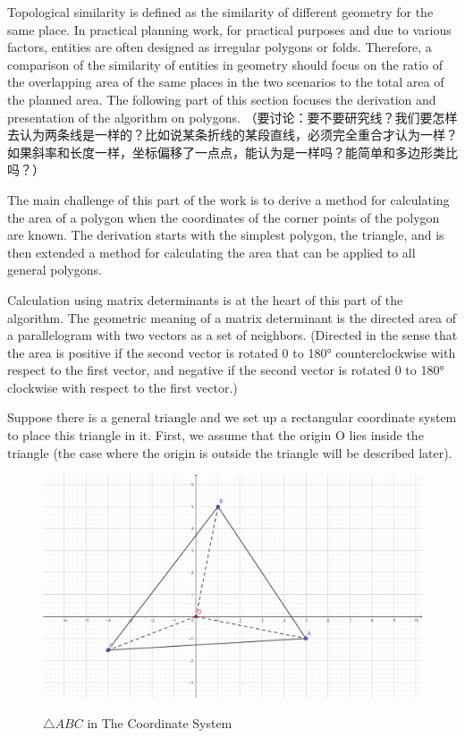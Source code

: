 Topological similarity is defined as the similarity of different geometry for the same place. In practical planning work, for practical purposes and due to various factors, entities are often designed as irregular polygons or folds. Therefore, a comparison of the similarity of entities in geometry should focus on the ratio of the overlapping area of the same places in the two scenarios to the total area of the planned area. The following part of this section focuses the derivation and presentation of the algorithm on polygons.
（要讨论：要不要研究线？我们要怎样去认为两条线是一样的？比如说某条折线的某段直线，必须完全重合才认为一样？如果斜率和长度一样，坐标偏移了一点点，能认为是一样吗？能简单和多边形类比吗？）

The main challenge of this part of the work is to derive a method for calculating the area of a polygon when the coordinates of the corner points of the polygon are known. The derivation starts with the simplest polygon, the triangle, and is then extended a method for calculating the area that can be applied to all general polygons.

Calculation using matrix determinants is at the heart of this part of the algorithm. The geometric meaning of a matrix determinant is the directed area of a parallelogram with two vectors as a set of neighbors. (Directed in the sense that the area is positive if the second vector is rotated 0 to 180° counterclockwise with respect to the first vector, and negative if the second vector is rotated 0 to 180° clockwise with respect to the first vector.)

Suppose there is a general triangle and we set up a rectangular coordinate system to place this triangle in it. First, we assume that the origin O lies inside the triangle (the case where the origin is outside the triangle will be described later).

\begin{figure}[H]
\caption{$\triangle ABC$ in The Coordinate System}
\centering
\includegraphics[scale=0.5]{pic2.png}
\label{fig:label}
\end{figure}

